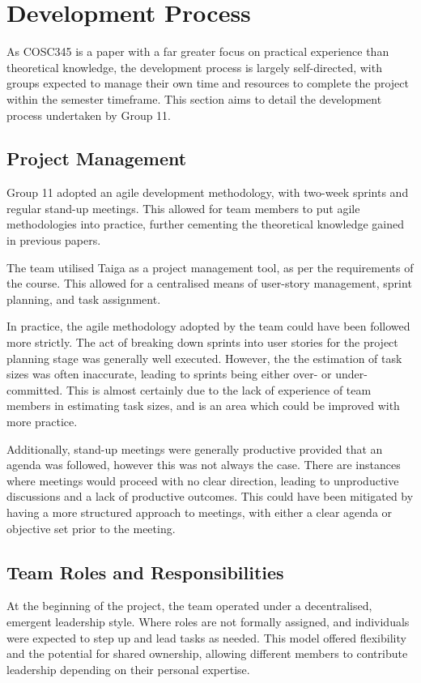 \documentclass[conference]{IEEEtran}
\begin{document}
\section{Development Process}
As COSC345 is a paper with a far greater focus on practical experience than theoretical knowledge, the development process is largely self-directed, with groups expected to manage their own time and resources to complete the project within the semester timeframe. This section aims to detail the development process undertaken by Group 11.

\subsection{Project Management}
Group 11 adopted an agile development methodology, with two-week sprints and regular stand-up meetings. This allowed for team members to put agile methodologies into practice, further cementing the theoretical knowledge gained in previous papers.

The team utilised Taiga as a project management tool, as per the requirements of the course. This allowed for a centralised means of user-story management, sprint planning, and task assignment.

In practice, the agile methodology adopted by the team could have been followed more strictly. The act of breaking down sprints into user stories for the project planning stage was generally well executed. However, the the estimation of task sizes was often inaccurate, leading to sprints being either over- or under-committed. This is almost certainly due to the lack of experience of team members in estimating task sizes, and is an area which could be improved with more practice.

Additionally, stand-up meetings were generally productive provided that an agenda was followed, however this was not always the case. There are instances where meetings would proceed with no clear direction, leading to unproductive discussions and a lack of productive outcomes. This could have been mitigated by having a more structured approach to meetings, with either a clear agenda or objective set prior to the meeting.

\subsection{Team Roles and Responsibilities}
At the beginning of the project, the team operated under a decentralised, emergent leadership style. Where roles are not formally assigned, and individuals were expected to step up and lead tasks as needed. This model offered flexibility and the potential for shared ownership, allowing different members to contribute leadership depending on their personal expertise.
\end{document}
